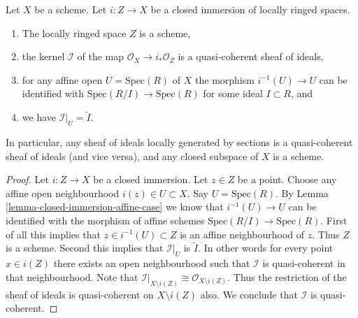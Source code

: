 \begin{lemma}
\label{lemma-closed-subspace-scheme}
Let $X$ be a scheme. Let $i : Z \to X$ be a closed immersion
of locally ringed spaces.
\begin{enumerate}
\item The locally ringed space $Z$ is a scheme,
\item the kernel $\mathcal{I}$ of the map
$\mathcal{O}_X \to i_*\mathcal{O}_Z$ is a quasi-coherent
sheaf of ideals,
\item for any affine open $U = \text{Spec}(R)$ of $X$ 
the morphism $i^{-1}(U) \to U$ can be identified with
$\text{Spec}(R/I) \to \text{Spec}(R)$ for some ideal $I \subset R$, and
\item we have $\mathcal{I}|_U = \widetilde I$.
\end{enumerate}
In particular, any sheaf of ideals locally generated by sections
is a quasi-coherent sheaf of ideals (and vice versa),
and any closed subspace of $X$ is a scheme.
\end{lemma}

\begin{proof}
Let $i : Z \to X$ be a closed immersion.
Let $z \in Z$ be a point. Choose any affine open
neighbourhood $i(z) \in U \subset X$. Say $U = \text{Spec}(R)$.
By Lemma \ref{lemma-closed-immersion-affine-case} we know
that $i^{-1}(U) \to U$ can be identified with the morphism
of affine schemes $\text{Spec}(R/I) \to \text{Spec}(R)$.
First of all this implies that $z \in i^{-1}(U) \subset Z$ is an 
affine neighbourhood of $z$. Thus $Z$ is a scheme. Second
this implies that $\mathcal{I}|_U$ is $\widetilde I$.
In other words for every point $x \in i(Z)$ there exists an
open neighbourhood such that $\mathcal{I}$ is quasi-coherent in
that neighbourhood. Note that $\mathcal{I}|_{X \setminus i(Z)}
\cong \mathcal{O}_{X \setminus i(Z)}$. Thus the restriction
of the sheaf of ideals is quasi-coherent on $X \setminus i(Z)$
also. We conclude that $\mathcal{I}$ is quasi-coherent.
\end{proof}


